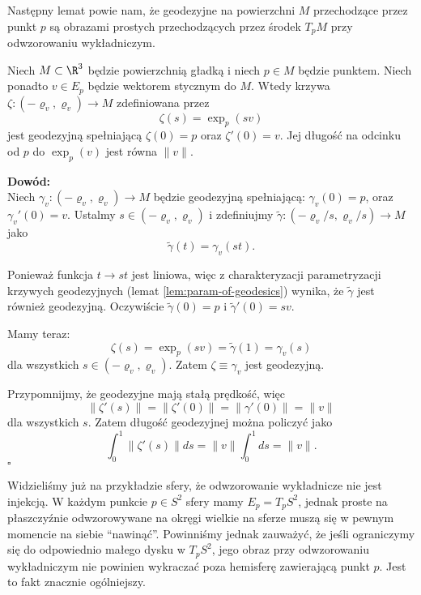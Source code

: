 \begin{frame}
\begin{center}

\end{center}

\end{frame}
Następny lemat powie nam, że geodezyjne na powierzchni $M$ przechodzące przez punkt $p$ są obrazami prostych przechodzących przez środek $T_pM$ przy odwzorowaniu wykładniczym.
\begin{frame}

\begin{lemat}
Niech $M\subset \R^3$ będzie powierzchnią gładką i niech $p\in M$ będzie punktem. Niech ponadto $v\in E_p$ będzie wektorem stycznym do $M$. Wtedy krzywa $\zeta\colon(-\varrho_v,\varrho_v)\to M$ zdefiniowana przez
\[\zeta(s)=\exp_p(sv)\] jest geodezyjną spełniającą $\zeta(0)=p$ oraz $\zeta'(0)=v$. Jej długość na odcinku od $p$ do $\exp_p(v)$ jest równa $\|v\|$.
\end{lemat}


\textcolor{ared}{\textbf{Dowód:}}\\\pause 
Niech $\gamma_v\colon (-\varrho_v,\varrho_v)\to M$ będzie geodezyjną spełniającą: $\gamma_v(0)=p$, oraz $\gamma_v'(0)=v$. Ustalmy $s\in (-\varrho_v,\varrho_v)$ i zdefiniujmy $\widetilde{\gamma}\colon(-\varrho_v/s,\varrho_v/s)\to M$ jako \[\widetilde{\gamma}(t)=\gamma_v(st).\]

\end{frame}
\begin{frame}
Ponieważ funkcja $t\to st$ jest liniowa, więc z charakteryzacji parametryzacji krzywych geodezyjnych (lemat \ref{lem:param-of-geodesics}) wynika, że $\widetilde{\gamma}$ jest również geodezyjną. Oczywiście $\widetilde{\gamma}(0)=p$ i $\widetilde{\gamma}'(0)=sv$.

\pause Mamy teraz:
\[\zeta(s)=\exp_p(sv)=\widetilde{\gamma}(1)=\gamma_v(s)\]
dla wszystkich $s\in (-\varrho_v, \varrho_v)$. Zatem $\zeta\equiv\gamma_v$ jest geodezyjną.

\pause Przypomnijmy, że geodezyjne mają stałą prędkość, więc
\[\|\zeta'(s)\|=\|\zeta'(0)\|=\|\gamma'(0)\|=\|v\|\]dla wszystkich $s$. Zatem długość geodezyjnej można policzyć jako
\[\int_0^1\|\zeta'(s)\|ds=\|v\|\int_0^1ds=\|v\|.\]
\hfill $\square$

\end{frame}

Widzieliśmy już na przykładzie sfery, że odwzorowanie wykładnicze nie jest injekcją. W każdym punkcie $p\in S^2$ sfery mamy $E_p=T_pS^2$, jednak proste na płaszczyźnie odwzorowywane na okręgi wielkie na sferze muszą się w pewnym momencie na siebie ``nawinąć''. Powinniśmy jednak zauważyć, że jeśli ograniczymy się do odpowiednio małego dysku w $T_pS^2$, jego obraz przy odwzorowaniu wykładniczym nie powinien wykraczać poza hemisferę zawierającą punkt $p$. Jest to fakt znacznie ogólniejszy.

